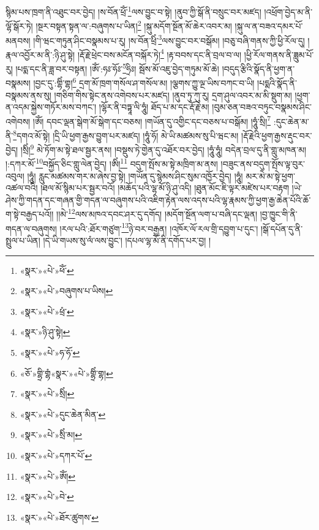 སྙིམ་པས་ཁྲག་ནི་འཐུང་བར་བྱེད། །ས་བོན་ཕྲོཾ་\footnote{«སྣར་»«པེ་»ཕོཾ་}ལས་བྱུང་བ་སྟེ། །ནུབ་ཀྱི་སྒོ་ནི་བསྲུང་བར་མཛད། །འཕྲོག་བྱེད་མ་ནི་ལྷོ་སྒོར་ཏེ། །སྔར་བསྟན་སྟན་ལ་:བཞུགས་པ་ཡིན།\footnote{«སྣར་»«པེ་»བཞུགས་པ་ཡིས།} །སྐུ་མདོག་སྔོན་མོ་ཆེར་འབར་མ། །སྐུ་ལ་ན་བཟའ་དམར་པོ་མནབས། །གི་ཝང་གཏུན་ཤིང་བསྣམས་པ་རུ། །ས་བོན་ཕྲིཾ་\footnote{«སྣར་»«པེ་»ཕྲཾ་}ལས་བྱུང་བར་བསྒོམ། །བཅུ་བཞི་གནས་ཀྱི་ཕྱི་རོལ་དུ། །རྣལ་འབྱོར་མ་ནི་:ཉི་ཤུ་སྟེ། །རྡོ་རྗེ་ཕྲེང་བས་མངོན་བསྐོར་ཏེ།\footnote{«སྣར་»ཉི་ཤུ་སྟེ།} །རྟ་བབས་དང་ནི་བྲལ་བ་ལ། །ཕྱི་རོལ་གནས་ནི་ཟླུམ་པོ་རུ། །པདྨ་དང་ནི་ཟླ་བར་བསྟན། །ཨོཾ་:ཧཿ་ཧོཿ་\footnote{«སྣར་»«པེ་»ཧ་ཧོ་}ཧྲིཿ། སྦོས་མོ་འཇུ་བྱེད་གཏུམ་མོ་ཆེ། །བདུད་རྩིའི་སྣོད་ནི་ཕྱག་ན་བསྣམས། །བྱང་དུ་:གྷིཾ་གྷ།\footnote{«ཅོ་»གྷྲི་གྷཾ«སྣར་»«པེ་»གྷྲིཾ་གྷ།} དྲག་མོ་ཁྲག་གསོལ་ཤ་གསོལ་མ། །ལྕགས་ཀྱུ་ལྔ་ཡིས་བཀང་བ་ཡི། །པདྨའི་སྣོད་ནི་བསྣམས་ནས་སུ། །གཅིག་གིས་སྟེང་ནས་འགེབས་པར་མཛད། །ནུབ་ཏུ་ཀུ་རུ། དྲག་ཤུལ་འབར་མ་མི་སྡུག་མ། །ཕྱག་ན་འདམ་སྐྱེས་གཏོར་མས་བཀང་། །ལྷོར་ནི་བཏྟཱ་ལི་ཧཱུཾ། ཐོད་པ་མ་དང་རྡོ་རྗེ་མ། །བུམ་ཅན་བཟའ་བཏུང་བསྣམས་ཤིང་འགེབས། །ཨོཾ། དབང་ལྡན་སྒེག་མོ་སྒེག་དང་བཅས། །གཡོན་དུ་འགྱིང་དང་བཅས་པ་བསྒོམ། །ཧཱུཾ་སྲི།\footnote{«སྣར་»«པེ་»སྲིཾ།} :དུང་ཆེན་མ་ནི་\footnote{«སྣར་»«པེ་»དུང་ཆེན་མིན་}དགའ་མོ་སྟེ། །དྲི་ཡི་ཕྱག་རྒྱས་བྱུག་པར་མཛད། །ཧཱུཾ་ཧོ། མེ་ཡི་མཚམས་སུ་པི་ཝང་མ། །རྡོ་རྗེའི་ཕྱག་རྒྱས་རྡུང་བར་བྱེད། །སྲིཾ།\footnote{«སྣར་»«པེ་»སྲིཾ་མ།} མེ་ཏོག་མ་སྟེ་ཐལ་སྦྱར་ནས། །བསྡུས་ཏེ་གྱེན་དུ་འཐོར་བར་བྱེད། །ཧཱུཾ་ཧཱུཾ། བདེན་བྲལ་དུ་ནི་གླུ་མཁན་མ། །:དཀར་མོ་\footnote{«སྣར་»«པེ་»དཀར་པོ་}བསྐྱོད་ཅིང་གླུ་ལེན་བྱེད། །ཨིཾ།\footnote{«སྣར་»«པེ་»ཨོཾ།} བདུག་སྤོས་མ་སྟེ་མཁྲིག་མ་ནས། །བཟུང་ནས་བདུག་སྤོས་ལྟ་བུར་འབུལ། །ཧཱུཾ། རླུང་མཚམས་གར་མ་ཞེས་བྱ་སྟེ། །གཡོན་དུ་སྙེམས་ཤིང་སུམ་འཁྱོར་བྱེད། །ཧཱུཾ། མར་མེ་མ་སྟེ་ཕྱག་འཚལ་བའི། །ཐལ་མོ་སྙིམ་པར་སྦྱར་བའོ། །མཆོད་པའི་ལྷ་མོ་ཉི་ཤུ་འདི། །ཐུན་མོང་ཇི་ལྟར་མཛེས་པར་བརྟག །ཡེ་ཤེས་ཀྱི་གདན་དང་གཞན་གྱི་གདན་ལ་བཞུགས་པའི་འཇིག་རྟེན་ལས་འདས་པའི་ལྷ་རྣམས་ཀྱི་ཕྱག་རྒྱ་ཆེན་པོའི་ཆོ་ག་སྟེ་བརྒྱད་པའོ།། །།མེ་\footnote{«སྣར་»«པེ་»བེ་}ལས་མཁའ་དབང་ཤར་དུ་དགོད། །མདོག་སྔོན་ལག་པ་བཞི་དང་ལྡན། །བྱ་ཁྱུང་གི་ནི་གདན་ལ་བཞུགས། །རལ་པའི་:ཐོར་གཙུག་\footnote{«སྣར་»«པེ་»ཐོར་ཚུགས་}ཉེ་བར་བརྒྱན། །འཁོར་ལོ་རལ་གྲི་དབྱུག་པ་དུང་། །སྒོ་དཔོན་དུ་ནི་སྤྲུལ་པ་ཡིན། །དེ་ཡི་གཡས་སུ་ལཾ་ལས་བྱུང་། །དཔལ་ལྷ་མོ་ནི་དགོད་པར་བྱ། །
